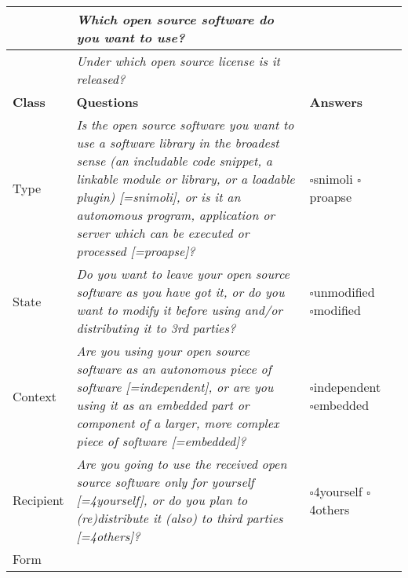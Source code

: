 \begin{small}
\begin{tabular}[h]{|l|l|l|l|}
\hline 
  \ & \textit{Which open source software do you want to use?} & \ \\
\hline 
  \ & \textit{Under which open source license is it released?} & \ \\
\hline
\hline 
\textbf{Class} & \textbf{Questions} & \textbf{Answers}\\
\hline 
\hline 
  Type
  & \parbox[c][2.6cm][c]{9.4cm}{
    \textit{Is the open source software you want to use a software library
    in the broadest sense (an includable code snippet, a linkable module or
    library, or a loadable plugin) [=snimoli], or is it an autonomous
    program, application or server which can be executed or processed
    [=proapse]?}} & \parbox{10em}{ 
      $\square$\hspace{1em}snimoli\\ 
      $\square$\hspace{1em}proapse}
    \\
\hline 
  State & 
  \parbox[c][1.6cm][c]{9.4cm}{
  \textit{Do you want to leave your open source software as you have
  got it, or do you want to modify it before using and/or distributing it to 3rd
  parties?}} &
  \parbox{10em}{
    $\square$\hspace{1em}unmodified\\
    $\square$\hspace{1em}modified} \\
\hline 
  Context & 
  \parbox[c][2cm][c]{9.4cm}{
  \textit{Are you using your open source software as an au\-to\-no\-mous piece
  of software [=independent], or are you using it as an embedded part or component
  of a larger, more complex piece of software [=embedded]?}} &
  \parbox{10em}{ $\square$\hspace{1em}independent\\
    $\square$\hspace{1em}embedded}\\
\hline 
  Recipient & 
  \parbox[c][1.6cm][c]{9.4cm}{
  \textit{Are you going to use the received open source software only for
  yourself [=4yourself], or do you plan to (re)distribute it (also) to third
  parties [=4others]?}}
  & \parbox{10em}{
    $\square$\hspace{1em}4yourself\\
    $\square$\hspace{1em}4others}\\
\hline 
  Form & 
  \parbox[c][1.6cm][c]{9.4cm}{
}
\end{tabular}
\end{small}
